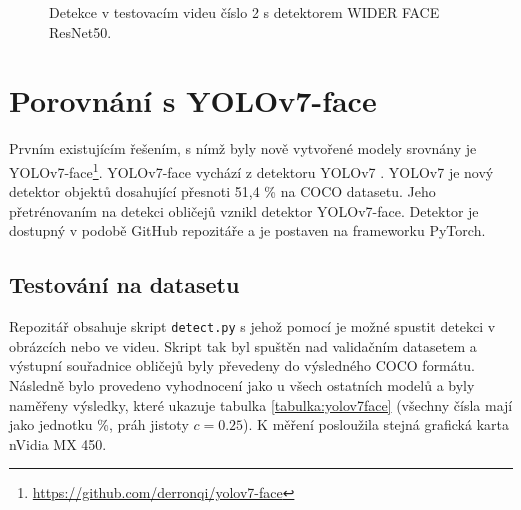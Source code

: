 \begin{figure}[H] 
  \begin{center}
  \label{obrazek:video2}
  \caption{Detekce v testovacím videu číslo 2 s detektorem WIDER FACE ResNet50.}
  \end{center}
\end{figure}


\section{Porovnání s YOLOv7-face}
\label{sekce:yolov7}
Prvním existujícím řešením, s nímž byly nově vytvořené modely srovnány je YOLOv7-face\footnote{\url{https://github.com/derronqi/yolov7-face}}. YOLOv7-face vychází z detektoru YOLOv7 \cite{yolov7}. YOLOv7 je nový detektor objektů dosahující přesnoti 51,4 \% na COCO datasetu. Jeho přetrénovaním na detekci obličejů vznikl detektor YOLOv7-face. Detektor je dostupný v podobě GitHub repozitáře a je postaven na frameworku PyTorch.

\subsection*{Testování na datasetu}
Repozitář obsahuje skript \texttt{detect.py} s jehož pomocí je možné spustit detekci v obrázcích nebo ve videu. Skript tak byl spuštěn nad validačním datasetem a výstupní souřadnice obličejů byly převedeny do výsledného COCO formátu. Následně bylo provedeno vyhodnocení jako u všech ostatních modelů a byly naměřeny výsledky, které ukazuje tabulka \ref{tabulka:yolov7face} (všechny čísla mají jako jednotku \%, práh jistoty $c=0.25$). K měření posloužila stejná grafická karta nVidia MX 450.

